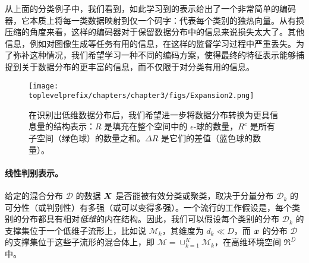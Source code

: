 \documentclass[../../book-main_zh.tex]{subfiles}
\begin{document}
从上面的分类例子中，我们看到，如此学习到的表示给出了一个非常简单的编码器，它本质上将每一类数据映射到仅一个码字：代表每个类别的独热向量。从有损压缩的角度来看，这样的编码器对于保留数据分布中的信息来说损失太大了。其他信息，例如对图像生成等任务有用的信息，在这样的监督学习过程中严重丢失。为了弥补这种情况，我们希望学习一种不同的编码方案，使得最终的特征表示能够捕捉到关于数据分布的更丰富的信息，而不仅限于对分类有用的信息。



\begin{figure}[ht]
	\centering
	\texttt{[image: \\toplevelprefix/chapters/chapter3/figs/Expansion2.png]}
	\caption{在识别出低维数据分布后，我们希望进一步将数据分布转换为更具信息量的结构表示：$R$ 是填充在整个空间中的 $\epsilon$-球的数量，$R^c$ 是所有子空间（绿色球）的数量之和。$\Delta R$ 是它们的差值（蓝色球的数量）。}\label{fig:sphere-packing}
	\label{fig:informative-representation}
\end{figure}


\paragraph{线性判别表示。}
给定的混合分布 $\mathcal{D}$ 的数据 $\bm{X}$ 是否能被有效分类或聚类，取决于分量分布 $\mathcal{D}_k$ 的可分性（或判别性）有多强（或可以变得多强）。一个流行的工作假设是，每个类别的分布都具有相对{\em 低维}的内在结构。因此，我们可以假设每个类别的分布 $\mathcal{D}_k$ 的支撑集位于一个低维子流形上，比如说 $\mathcal{M}_k$，其维度为 $d_k \ll D$，而 $\bm{x}$ 的分布 $\mathcal D$ 的支撑集位于这些子流形的混合体上，即 $\mathcal M = \cup_{k=1}^K \mathcal{M}_k$，在高维环境空间 $\Re^D$ 中。
\end{document}
